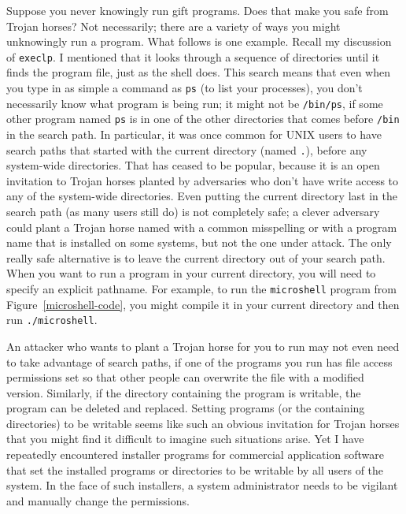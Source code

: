 Suppose you never knowingly run gift programs.  Does that make you
safe from Trojan horses?  Not necessarily; there
are a variety of ways you might unknowingly run a program.  What follows
is one example.
  Recall
my discussion of
\verb|execlp|.  I mentioned that it looks through a sequence of
directories until it finds the program file, just as the shell does.
This search means that even when you type in as simple a command as
\verb|ps| (to list your processes), you don't necessarily know what
program is being run; it might not be \verb|/bin/ps|, if some other
program named \verb|ps| is in one of the other directories that comes
before \verb|/bin| in the search path.  In particular, it was once
common for UNIX users to have search paths that started with the
current directory (named \verb|.|), before any system-wide
directories.  That has ceased to be popular, because it is an open
invitation to Trojan horses planted by adversaries who don't have
write access to any of the system-wide directories.  Even putting the
current directory last in the search path (as many users still do) is
not completely safe; a clever adversary could plant a Trojan horse
named with a common misspelling or with a program name that is
installed on some systems, but not the one under attack.  The only
really safe alternative is to leave the current directory out of your
search path.  When you want to run a program in your current
directory, you will need to specify an explicit pathname.  For
example, to run the \texttt{microshell} program from
Figure~\ref{microshell-code}, you might compile it in your current
directory and then run \verb|./microshell|.

An attacker who wants to plant a Trojan horse for you to run may not
even need to take advantage of search paths, if one of the programs
you run has file access permissions set so that other people can
overwrite the file with a modified version.  Similarly, if the
directory containing the program is writable, the program
can be deleted and replaced.  Setting programs (or the containing
directories) to be writable seems like such an obvious invitation for Trojan horses
that you might find it difficult to imagine such situations arise.
Yet I have repeatedly encountered installer
programs for commercial application software that set the installed
programs or directories to be writable by all users of the system.  In
the face of such installers, a system administrator needs to be
vigilant and manually change the permissions.  

